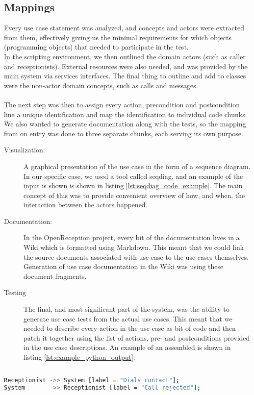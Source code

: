 \subsection{Mappings}
Every use case statement was analyzed, and concepts and actors were extracted from them, effectively giving us the minimal requirements for which objects (programming objects) that needed to participate in the test.\\
In the scripting environment, we then outlined the domain actors (such as caller and receptionists). External resources were also needed, and was provided by the main system via services interfaces. The final thing to outline and add to classes were the non-actor domain concepts, such as calls and messages.\\\\
The next step was then to assign every action, precondition and postcondition line a unique identification and map the identification to individual code chunks. We also wanted to generate documentation along with the tests, so the mapping from on entry was done to three separate chunks, each serving its own purpose.
\begin{description}
  \item[Visualization:] A graphical presentation of the use case in the form of a sequence diagram. In our specific case, we used a tool called seqdiag, and an example of the input is shown is shown in listing \ref{lst:seqdiag_code_example}. The main concept of this was to provide convenient overview of how, and when, the interaction between the actors happened.
  \item[Documentation:] In the OpenReception project, every bit of the documentation lives in a Wiki which is formatted using Markdown. This meant that we could link the source documents associated with use case to the use cases themselves. Generation of use case documentation in the Wiki was using these document fragments.
  \item[Testing] The final, and most significant part of the system, was the ability to generate use case tests from the actual use cases. This meant that we needed to describe every action in the use case as bit of code and then patch it together using the list of actions, pre- and postconditions provided in the use case descriptions. An example of an assembled is shown in listing \ref{lst:example_python_output}.
\end{description}
\begin{lstlisting}[language=Bash, caption=Example seqdiag input, label=lst:seqdiag_code_example]

Receptionist ->> System [label = "Dials contact"];
System       ->> Receptionist [label = "Call rejected"];
\end{lstlisting}

